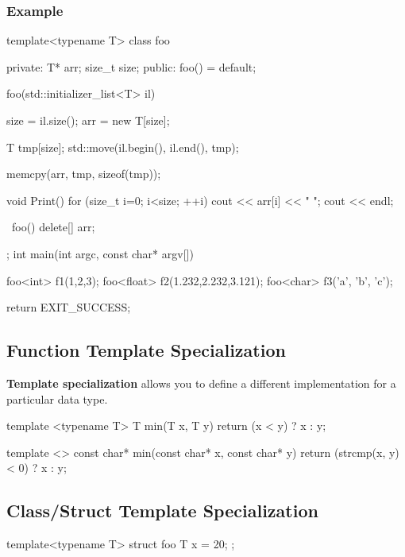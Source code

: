 \documentclass{report}
\begin{document}
\begin{concept}
    \subsubsection{Example}
    \bigbreak \noindent 
    \begin{cppcode}
        template<typename T>
        class foo {
        private:
            T* arr;
            size_t size;
        public:
            foo() = default;

            foo(std::initializer_list<T> il) {

                size = il.size();
                arr = new T[size];

                T tmp[size];
                std::move(il.begin(), il.end(), tmp);

                memcpy(arr, tmp, sizeof(tmp));
            }

            void Print() {
                for (size_t i=0; i<size; ++i) {
                    cout << arr[i] << " ";
                }
                cout << endl;
            }

            ~foo() { delete[] arr; }


        };
        int main(int argc, const char* argv[]) {

            foo<int> f1({1,2,3});
            foo<float> f2({1.232,2.232,3.121});
            foo<char> f3({'a', 'b', 'c'});

            return EXIT_SUCCESS;
        }
    \end{cppcode}

    \pagebreak 
    \subsection{Function Template Specialization}
    \bigbreak \noindent 
    \begin{concept}
        \textbf{Template specialization} allows you to define a different implementation for a particular data type.
    \end{concept}
    \bigbreak \noindent 
    \begin{cppcode}
    template <typename T>
    T min(T x, T y) {
        return (x < y) ? x : y;
    }

    template <>
    const char* min(const char* x, const char* y) {
        return (strcmp(x, y) < 0) ? x : y;
    }
    \end{cppcode}

    \bigbreak \noindent 
    \subsection{Class/Struct Template Specialization}
    \bigbreak \noindent 
    \begin{cppcode}
    template<typename T>
    struct foo {
        T x = 20;
    };


\end{cppcode}
\end{concept}
\end{document}
